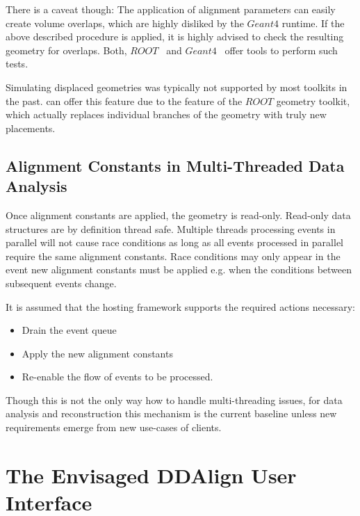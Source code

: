 \documentclass[10pt,a4paper]{article}
\begin{document}
\noindent
There is a caveat though: The application of alignment parameters can
easily create volume overlaps, which are highly disliked by the $Geant4$ 
runtime. If the above described procedure is applied, it is highly advised 
to check the resulting geometry for overlaps. Both, $ROOT$~\cite{bib:ROOT-tgeo}
and $Geant4$~\cite{bib:geant4} offer tools to perform such tests.

\noindent
Simulating displaced geometries was typically not supported by most toolkits
in the past. \DDA can offer this feature due to the feature of the $ROOT$ 
geometry toolkit, which actually replaces individual branches of the 
geometry with truly new placements.


\subsection{Alignment Constants in Multi-Threaded Data Analysis}
\label{subsect:ddalign-intro-multi-threading}
\noindent
Once alignment constants are applied, the \DDhep geometry is read-only.
Read-only data structures are by definition thread safe. Multiple threads
processing events in parallel will not cause race conditions as long as 
all events processed in parallel require the same alignment constants.
Race conditions may only appear in the event new alignment constants must be 
applied e.g. when the conditions between subsequent events change.

\noindent
It is assumed that the hosting framework supports the required actions
necessary:
\begin{itemize}\itemcompact
\item Drain the event queue
\item Apply the new alignment constants
\item Re-enable the flow of events to be processed.
\end{itemize}
\noindent
Though this is not the only way how to handle multi-threading issues, for
data analysis and reconstruction this mechanism is the current baseline
unless new requirements emerge from new use-cases of clients.


\newpage
\section{The Envisaged DDAlign User Interface}
\label{sec:ddalign-user-manual-ddalign-interface}
\end{document}
